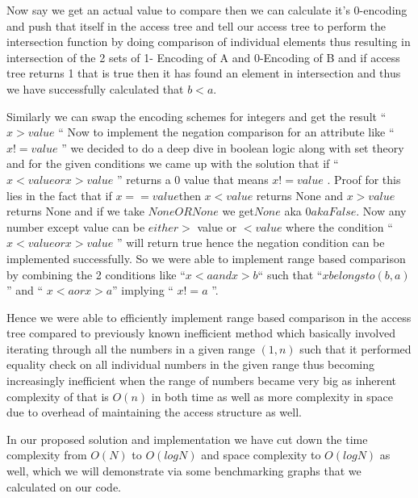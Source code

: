 Now say we get an actual value to compare then we can calculate it’s 0-encoding and push that itself in the access tree and tell our access tree to perform the intersection function by doing comparison of individual elements thus resulting in intersection of the 2 sets of 1- Encoding of A and 0-Encoding of B and if access tree returns 1 that is true then it has found an element in intersection and thus we have successfully calculated that \(b < a\).

Similarly we can swap the encoding schemes for integers and get the result 
 “ \(x > value\) “ 
Now to implement the negation comparison for an attribute like “ \(x!= value\)  ” we decided to do a deep dive in boolean logic along with set theory and for the given conditions we came up with the solution that if “ \(x < value or x > value \) ” returns a 0 value that means \(x != value\) . Proof for this lies in the fact that if \(x == value \)then \(x < value\) returns None and \(x > value\) returns None and if we take \(None OR None\) we get\(None\)  aka \(0 aka False\). Now any number except value can be \(either >\) value or \(< value\) where the condition “ \( x < value or x > value \) ” will return true hence the negation condition can be implemented successfully. So we were able to implement range based comparison by combining the 2 conditions like “\(x < a and x > b \)“ such that “\(x belongs to ( b,a )\)”  and “ \(x<a or x >a \)” implying “ \(x!=a\) ”.

Hence we were able to efficiently implement range based comparison in the access tree compared to previously known inefficient method which basically involved iterating through all the numbers in a given range \(( 1,n )\) such that it performed equality check on all individual numbers in the given range thus becoming increasingly inefficient when the range of numbers became very big as inherent complexity of that is \(O(n)\) in both time as well as more complexity in space due to overhead of maintaining the access structure as well.


In our proposed solution and implementation we have cut down the time complexity from \(O (N)\) to \(O (log N)\)  and space complexity to \(O (log N)\) as well, which we will demonstrate via some benchmarking graphs that we calculated on our code.







